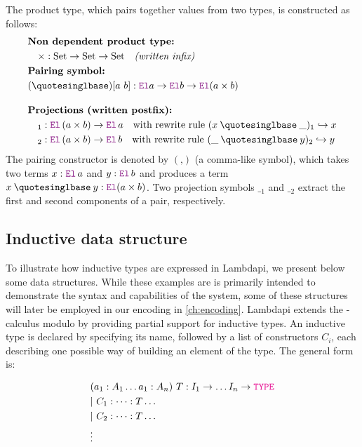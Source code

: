 \begin{example}\label{def-product}
The product type, which pairs together values from two types, is constructed as follows:
\begin{align*}
&\textbf{Non dependent product type:} \\
&\quad \times : \text{Set} \to \text{Set} \to \text{Set} \quad \textit{(written infix)} \\
&\textbf{Pairing symbol:} \\
&(\mathbin{‚}) [a~b] : \el a \ra \el b \ra \el (a \times b)\\[1em]
&\textbf{Projections (written postfix):}  \\
&\quad {}_1 : \el\, (a \times b) \ra \el\, a \quad \text{with rewrite rule } (x \mathbin{‚} \_)_1 \re x \\
&\quad {}_2 : \el\, (a \times b) \ra \el\, b \quad \text{with rewrite rule } (\_ \mathbin{‚} y)_2 \re y
\end{align*}
The pairing constructor is denoted by $(‚)$ (a comma-like symbol), which takes two terms $x : \el\,a$ and $y : \el\, b$ and produces a term $x \mathbin{‚} y : \el (a \times b)$.
Two projection symbols ${\_}_1$ and ${\_}_2$ extract the first and second components of a pair, respectively.
\end{example}

\subsection{Inductive data structure}

To illustrate how inductive types are expressed in Lambdapi, we present below some data structures.
While these examples are is primarily intended to demonstrate the syntax and capabilities of the system, some of these structures will later be employed in our encoding in \cref{ch:encoding}.
Lambdapi extends the \lpm-calculus modulo by providing partial support for inductive types.
An inductive type is declared by specifying its name, followed by a list of constructors $C_i$, each describing one possible way of building an element of the type.
The general form is:

\begin{align*}
&(a_1 : A_1 \dots a_1 : A_n)~T : I_1 \ra \dots I_n \ra \type\\
&|~C_1 : \dots : T \dots\\
&|~C_2 : \dots : T \dots\\
&\vdots
\end{align*}

